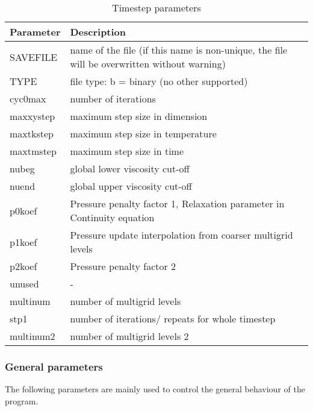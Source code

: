 \begin{table}[H]
\small
\centering
\begin{tabular}{l p{13cm}}
\toprule
Parameter & Description \\
\midrule
SAVEFILE & name of the file (if this name is non-unique, the file will be overwritten without warning) \\
TYPE & file type: b = binary (no other supported) \\
cyc0max & number of iterations \\
maxxystep & maximum step size in dimension \todo{???} \\
maxtkstep & maximum step size in temperature \todo{???} \\
maxtmstep & maximum step size in time \todo{???} \\
nubeg & global lower viscosity cut-off \\
nuend & global upper viscosity cut-off \\
p0koef & Pressure penalty factor 1, Relaxation parameter in Continuity equation \\
p1koef & Pressure update interpolation from coarser multigrid levels \\
p2koef & Pressure penalty factor 2 \todo{???} \\
unused & - \\
multinum &  number of multigrid levels \\
stp1 & number of iterations/ repeats for whole timestep \\
multinum2 & number of multigrid levels 2 \todo{???} \\
\bottomrule
\end{tabular}
\caption{Timestep parameters}
\label{tbl:timestep_parameters}
\end{table}

\subsubsection{General parameters}
The following parameters are mainly used to control the general behaviour of the program.

